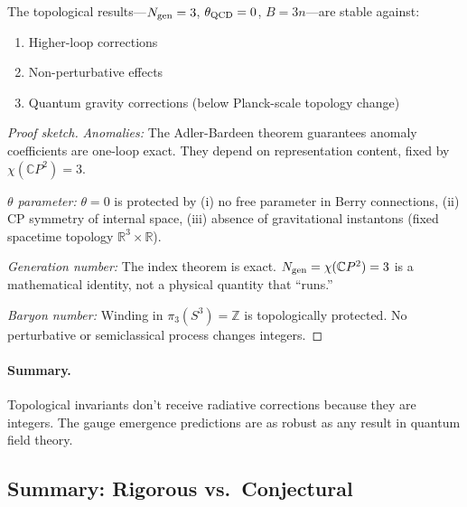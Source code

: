 \begin{theorem}[UV Stability]\label{thm:uv-stable}
The topological results---$N_{\rm gen} = 3$, $\theta_{\rm QCD} = 0$, $B = 3n$---are 
stable against:
\begin{enumerate}
\item Higher-loop corrections
\item Non-perturbative effects
\item Quantum gravity corrections (below Planck-scale topology change)
\end{enumerate}
\end{theorem}

\begin{proof}[Proof sketch]
\textit{Anomalies:} The Adler-Bardeen theorem guarantees anomaly coefficients are 
one-loop exact. They depend on representation content, fixed by $\chi(\mathbb{C}P^2) = 3$.

\textit{$\theta$ parameter:} $\theta = 0$ is protected by (i) no free parameter in Berry 
connections, (ii) CP symmetry of internal space, (iii) absence of gravitational 
instantons (fixed spacetime topology $\mathbb{R}^3 \times \mathbb{R}$).

\textit{Generation number:} The index theorem is exact. $N_{\rm gen} = \chi(\mathbb{C}P^2) = 3$ 
is a mathematical identity, not a physical quantity that ``runs.''

\textit{Baryon number:} Winding in $\pi_3(S^3) = \mathbb{Z}$ is topologically protected. 
No perturbative or semiclassical process changes integers.
\end{proof}

\paragraph{Summary.}
Topological invariants don't receive radiative corrections because they are integers. 
The gauge emergence predictions are as robust as any result in quantum field theory.

\subsection{Summary: Rigorous vs.\ Conjectural}\label{app:summary}

